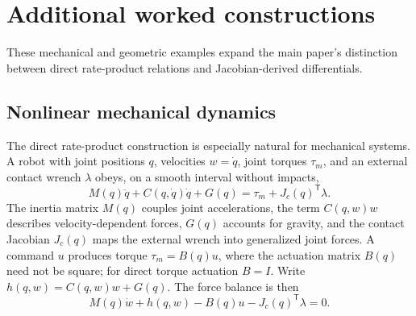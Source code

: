 \documentclass[journal]{IEEEtran}
\begin{document}
\section{Additional worked constructions}
\label{sec:constructions}
These mechanical and geometric examples expand the main paper's distinction
between direct rate-product relations and Jacobian-derived differentials.
\subsection{Nonlinear mechanical dynamics}
The direct rate-product construction is especially natural for mechanical
systems. A robot with joint positions $q$, velocities $w=\dot q$, joint
torques $\tau_m$, and an external contact wrench $\lambda$ obeys, on a
smooth interval without impacts, 
\begin{equation}
M(q)\ddot q+C(q,\dot q)\dot q+G(q) =\tau_m+J_c(q)^{\mathsf{T}}\lambda.
\label{eq:mechanical}
\end{equation}
The inertia matrix $M(q)$ couples joint accelerations, the term $C(q,w)w$
describes velocity-dependent forces, $G(q)$ accounts for gravity, and the
contact Jacobian $J_c(q)$ maps the external wrench into generalized joint
forces. A command $u$ produces torque $\tau_m=B(q)u$, where the actuation
matrix $B(q)$ need not be square; for direct torque actuation $B=I$. Write $%
h(q,w)=C(q,w)w+G(q)$. The force balance is then 
\begin{equation}
M(q)\dot w+h(q,w)-B(q)u-J_c(q)^{\mathsf{T}}\lambda=0.
\label{eq:mechanical_balance}
\end{equation}
\end{document}
